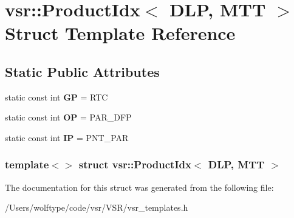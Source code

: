 \hypertarget{structvsr_1_1_product_idx_3_01_d_l_p_00_01_m_t_t_01_4}{\section{vsr\-:\-:Product\-Idx$<$ D\-L\-P, M\-T\-T $>$ Struct Template Reference}
\label{structvsr_1_1_product_idx_3_01_d_l_p_00_01_m_t_t_01_4}
}
\subsection*{Static Public Attributes}
\begin{DoxyCompactItemize}
\item 
\hypertarget{structvsr_1_1_product_idx_3_01_d_l_p_00_01_m_t_t_01_4_a533a2ed7e5bb1202abcfd8355816c2ce}{static const int {\bfseries G\-P} = R\-T\-C}\label{structvsr_1_1_product_idx_3_01_d_l_p_00_01_m_t_t_01_4_a533a2ed7e5bb1202abcfd8355816c2ce}

\item 
\hypertarget{structvsr_1_1_product_idx_3_01_d_l_p_00_01_m_t_t_01_4_ac153e9ecce1b5c716111cadbc0652282}{static const int {\bfseries O\-P} = P\-A\-R\-\_\-\-D\-F\-P}\label{structvsr_1_1_product_idx_3_01_d_l_p_00_01_m_t_t_01_4_ac153e9ecce1b5c716111cadbc0652282}

\item 
\hypertarget{structvsr_1_1_product_idx_3_01_d_l_p_00_01_m_t_t_01_4_a2321eb5e208ffebe5459a91bb17d400e}{static const int {\bfseries I\-P} = P\-N\-T\-\_\-\-P\-A\-R}\label{structvsr_1_1_product_idx_3_01_d_l_p_00_01_m_t_t_01_4_a2321eb5e208ffebe5459a91bb17d400e}

\end{DoxyCompactItemize}
\subsubsection*{template$<$$>$ struct vsr\-::\-Product\-Idx$<$ D\-L\-P, M\-T\-T $>$}



The documentation for this struct was generated from the following file\-:\begin{DoxyCompactItemize}
\item 
/\-Users/wolftype/code/vsr/\-V\-S\-R/vsr\-\_\-templates.\-h\end{DoxyCompactItemize}

